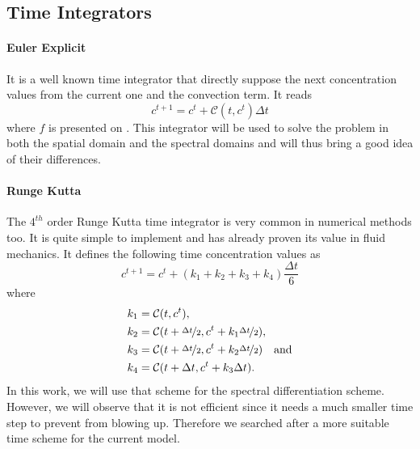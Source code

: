 \documentclass[10pt,a4paper,twocolumn]{article}
\begin{document}
\subsection{Time Integrators} %
\label{sub:time_integrators}

\paragraph{Euler Explicit} It is a well known time integrator that directly suppose the next concentration values from the current one and the convection term. It reads
\begin{equation}
	c^{t+1} = c^t + \mathcal C(t,c^t) \Delta t
\end{equation}
where $f$ is presented on . This integrator will be used to solve the problem in both the spatial domain and the spectral domains and will thus bring a good idea of their differences.

\paragraph{Runge Kutta} The $4^{th}$ order Runge Kutta time integrator is very common in numerical methods too. It is quite simple to implement and has already proven its value in fluid mechanics. It defines the following time concentration values as
\begin{equation}
	c^{t+1} = c^t + (k_1 + k_2 + k_3 + k_4) \frac{\Delta t}{6}
\end{equation}
where
\begin{align*}
	k_1 &= \mathcal C(t, c^t), \\
	k_2 &= \mathcal C(t + \nicefrac{\Delta t}{2}, c^t + k_1 \nicefrac{\Delta t}{2}), \\
	k_3 &= \mathcal C(t + \nicefrac{\Delta t}{2}, c^t + k_2 \nicefrac{\Delta t}{2})\quad\text{and} \\
	k_4 &= \mathcal C(t + \Delta t, c^t + k_3 \Delta t).
\end{align*}
In this work, we will use that scheme for the spectral differentiation scheme. However, we will observe that it is not efficient since it needs a much smaller time step to prevent from blowing up. Therefore we searched after a more suitable time scheme for the current model.
\end{document}
